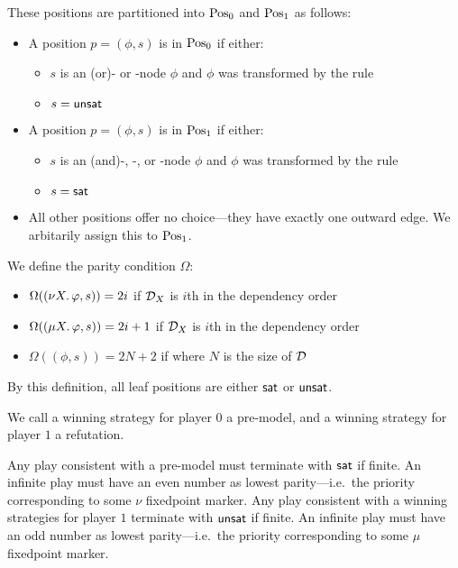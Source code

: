 \begin{definition}
These positions are partitioned into \(\Pos_0\) and \(\Pos_1\) as follows:

\begin{itemize}
\tightlist
\item
  A position \(p = (\phi, s)\) is in \(\Pos_0\) if either:

  \begin{itemize}
  \tightlist
  \item
    \(s\) is an (or)- or \appb{}-node \(\phi\) and \(\phi\) was transformed by the rule
  \item
    \(s = \unsat{}\)
  \end{itemize}
\item
  A position \(p = (\phi, s)\) is in \(\Pos_1\) if either:

  \begin{itemize}
  \tightlist
  \item
    \(s\) is an (and)-, \appa{}-, or \appc{}-node \(\phi\) and \(\phi\) was transformed by the rule
  \item
    \(s = \sat{}\)
  \end{itemize}
\item
  All other positions offer no choice---they have exactly one outward edge.
  We arbitarily assign this to \(\Pos_1\).
\end{itemize}

We define the parity condition \(\Omega\):

\begin{itemize}
\tightlist
\item
  \(\Omega((\nu X\ldotp \phi, s)) = 2i\) if \(\deflist_X\) is \(i\)th in the dependency order
\item
  \(\Omega((\mu X\ldotp \phi, s)) = 2i + 1\) if \(\deflist_X\) is \(i\)th in the dependency order
\item
  \(\Omega((\phi, s)) = 2N + 2\) if where \(N\) is the size of \(\deflist\)
\end{itemize}

\end{definition}

By this definition, all leaf positions are either \(\sat{}\) or \(\unsat{}\).

\begin{definition}We call a winning strategy for player \(0\) a pre-model,
and a winning strategy for player \(1\) a refutation.\end{definition}

Any play consistent with a pre-model must terminate with \(\sat{}\) if finite.
An infinite play must have an even number as lowest parity---i.e.~the priority corresponding to some \(\nu\) fixedpoint marker.
Any play consistent with a winning strategies for player \(1\) terminate with \(\unsat{}\) if finite.
An infinite play must have an odd number as lowest parity---i.e.~the priority corresponding to some \(\mu\) fixedpoint marker.

